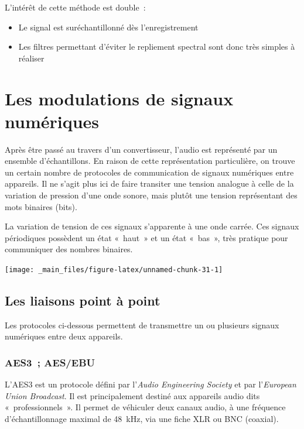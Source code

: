 \documentclass[
]{book}
\providecommand{\tightlist}{%
  \setlength{\itemsep}{0pt}\setlength{\parskip}{0pt}}
\begin{document}
L'intérêt de cette méthode est double~:

\begin{itemize}
\tightlist
\item
  Le signal est suréchantillonné dès l'enregistrement
\item
  Les filtres permettant d'éviter le repliement spectral sont donc très simples à réaliser
\end{itemize}

\hypertarget{les-modulations-de-signaux-numuxe9riques}{%
\chapter{Les modulations de signaux numériques}\label{les-modulations-de-signaux-numuxe9riques}}

Après être passé au travers d'un convertisseur, l'audio est représenté par un ensemble d'échantillons. En raison de cette représentation particulière, on trouve un certain nombre de protocoles de communication de signaux numériques entre appareils. Il ne s'agit plus ici de faire transiter une tension analogue à celle de la variation de pression d'une onde sonore, mais plutôt une tension représentant des mots binaires (bits).

La variation de tension de ces signaux s'apparente à une onde carrée. Ces signaux périodiques possèdent un état «~haut~» et un état «~bas~», très pratique pour communiquer des nombres binaires.

\begin{center}\texttt{[image: \_main\_files/figure-latex/unnamed-chunk-31-1]} \end{center}

\hypertarget{les-liaisons-point-uxe0-point}{%
\section{Les liaisons point à point}\label{les-liaisons-point-uxe0-point}}

Les protocoles ci-dessous permettent de transmettre un ou plusieurs signaux numériques entre deux appareils.

\hypertarget{aes3-aesebu}{%
\subsection{AES3~; AES/EBU}\label{aes3-aesebu}}

L'AES3 est un protocole défini par l'\emph{Audio Engineering Society} et par l'\emph{European Union Broadcast}. Il est principalement destiné aux appareils audio dits «~professionnels~». Il permet de véhiculer deux canaux audio, à une fréquence d'échantillonnage maximal de 48~kHz, via une fiche XLR ou BNC (coaxial).
\end{document}
